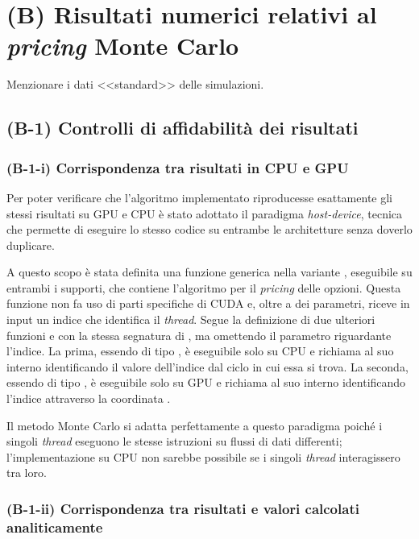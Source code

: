 \chapter{(B) Risultati numerici relativi al \textit{pricing} Monte Carlo}
Menzionare i dati <<standard>> delle simulazioni.

\section{(B-1) Controlli di affidabilità dei risultati}
\subsection{(B-1-i) Corrispondenza tra risultati in CPU e GPU} \label{sec:cpugpu}

Per poter verificare che l'algoritmo implementato riproducesse esattamente gli stessi risultati su GPU e CPU è stato adottato il paradigma \textit{host-device}, tecnica che permette di eseguire lo stesso codice su entrambe le architetture senza doverlo duplicare.

A questo scopo è stata definita una funzione generica  nella variante  , eseguibile su entrambi i supporti, che contiene l'algoritmo per il \textit{pricing} delle opzioni. Questa funzione non fa uso di parti specifiche di CUDA e, oltre a dei parametri, riceve in input un indice che identifica il \textit{thread}. Segue la definizione di due ulteriori funzioni  e   con la stessa segnatura di , ma omettendo il parametro riguardante l'indice. La prima, essendo di tipo , è eseguibile solo su CPU e richiama al suo interno  identificando il valore dell'indice dal ciclo  in cui essa si trova. La seconda, essendo di tipo , è eseguibile solo su GPU e richiama al suo interno  identificando l'indice attraverso la coordinata . 

Il metodo Monte Carlo si adatta perfettamente a questo paradigma poiché i singoli \textit{thread} eseguono le stesse istruzioni su flussi di dati differenti; l'implementazione su CPU non sarebbe possibile se i singoli \textit{thread} interagissero tra loro. 

\subsection{(B-1-ii) Corrispondenza tra risultati e valori calcolati analiticamente}


